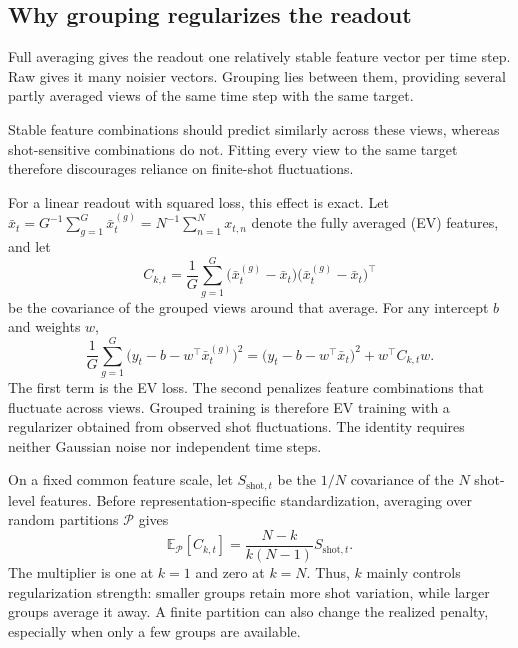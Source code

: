 \subsection{Why grouping regularizes the readout}
\label{sec:mechanism}

Full averaging gives the readout one relatively stable feature vector per time
step. Raw gives it many noisier vectors. Grouping lies between them, providing
several partly averaged views of the same time step with the same target.

Stable feature combinations should predict similarly across these views,
whereas shot-sensitive combinations do not. Fitting every view to the same
target therefore discourages reliance on finite-shot fluctuations.

For a linear readout with squared loss, this effect is exact. Let
$\bar{x}_t=G^{-1}\sum_{g=1}^{G}\bar{x}_t^{(g)}
=N^{-1}\sum_{n=1}^{N}x_{t,n}$ denote the fully averaged (EV) features, and let
\begin{equation*}
  C_{k,t}=\frac{1}{G}\sum_{g=1}^{G}
  \bigl(\bar{x}_t^{(g)}-\bar{x}_t\bigr)
  \bigl(\bar{x}_t^{(g)}-\bar{x}_t\bigr)^{\!\top}
\end{equation*}
be the covariance of the grouped views around that average. For any intercept
$b$ and weights $w$,
\begin{equation}
  \frac{1}{G}\sum_{g=1}^{G}
  \bigl(y_t-b-w^\top\bar{x}_t^{(g)}\bigr)^2
  =\bigl(y_t-b-w^\top\bar{x}_t\bigr)^2+w^\top C_{k,t}w.
  \label{eq:loss-decomposition}
\end{equation}
The first term is the EV loss. The second penalizes feature combinations that
fluctuate across views. Grouped training is therefore EV training with a
regularizer obtained from observed shot fluctuations. The identity requires
neither Gaussian noise nor independent time steps.

On a fixed common feature scale, let $S_{\mathrm{shot},t}$ be the $1/N$
covariance of the $N$ shot-level features. Before representation-specific
standardization, averaging over random partitions $\mathcal{P}$ gives
\begin{equation}
  \mathbb{E}_{\mathcal{P}}[C_{k,t}]
  =\frac{N-k}{k(N-1)}S_{\mathrm{shot},t}.
  \label{eq:penalty-scale}
\end{equation}
The multiplier is one at $k=1$ and zero at $k=N$. Thus, $k$ mainly controls
regularization strength: smaller groups retain more shot variation, while
larger groups average it away. A finite partition can also change the realized
penalty, especially when only a few groups are available.

